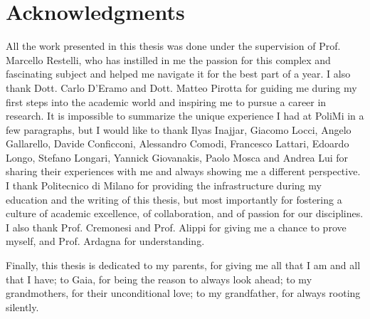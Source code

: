 \chapter*{Acknowledgments}



All the work presented in this thesis was done under the supervision of Prof. 
Marcello Restelli, who has instilled in me the passion for this complex and 
fascinating subject and helped me navigate it for the best part of a year. 
I also thank Dott. Carlo D'Eramo and Dott. Matteo Pirotta for guiding me during 
my first steps into the academic world and inspiring me to pursue a career in 
research. 
It is impossible to summarize the unique experience I had at PoliMi in a few
paragraphs, but I would like to thank Ilyas Inajjar, Giacomo Locci, Angelo 
Gallarello, Davide Conficconi, Alessandro Comodi, Francesco Lattari, Edoardo
Longo, Stefano Longari, Yannick Giovanakis, Paolo Mosca and Andrea Lui for 
sharing their experiences with me and always showing me a different perspective. 
I thank Politecnico di Milano for providing the infrastructure during my education
and the writing of this thesis, but most importantly for fostering a culture 
of academic excellence, of collaboration, and of passion for our disciplines.
I also thank Prof. Cremonesi and Prof. Alippi for giving me a chance to prove 
myself, and Prof. Ardagna for understanding.

Finally, this thesis is dedicated to my parents, for giving me all that I am and
all that I have; 
to Gaia, for being the reason to always look ahead;
to my grandmothers, for their unconditional love; 
to my grandfather, for always rooting silently.